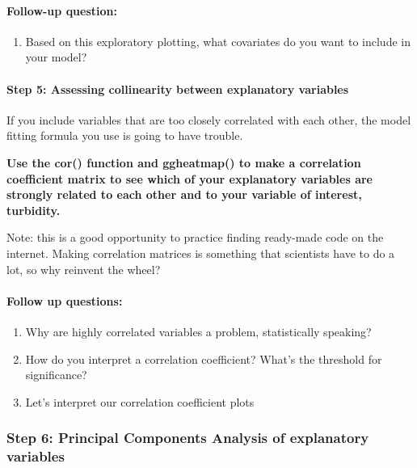 \documentclass[]{article}
\providecommand{\tightlist}{%
  \setlength{\itemsep}{0pt}\setlength{\parskip}{0pt}}
\let\oldparagraph\paragraph
\renewcommand{\paragraph}[1]{\oldparagraph{#1}\mbox{}}
\begin{document}
\hypertarget{follow-up-question}{%
\paragraph{Follow-up question:}\label{follow-up-question}}

\begin{enumerate}
\def\labelenumi{\arabic{enumi}.}
\tightlist
\item
  Based on this exploratory plotting, what covariates do you want to
  include in your model?
\end{enumerate}

\hypertarget{step-5-assessing-collinearity-between-explanatory-variables}{%
\paragraph{Step 5: Assessing collinearity between explanatory
variables}\label{step-5-assessing-collinearity-between-explanatory-variables}}

If you include variables that are too closely correlated with each
other, the model fitting formula you use is going to have trouble.

\textbf{Use the cor() function and ggheatmap() to make a correlation
coefficient matrix to see which of your explanatory variables are
strongly related to each other and to your variable of interest,
turbidity.}

Note: this is a good opportunity to practice finding ready-made code on
the internet. Making correlation matrices is something that scientists
have to do a lot, so why reinvent the wheel?

\hypertarget{follow-up-questions-1}{%
\paragraph{Follow up questions:}\label{follow-up-questions-1}}

\begin{enumerate}
\def\labelenumi{\arabic{enumi}.}
\tightlist
\item
  Why are highly correlated variables a problem, statistically speaking?
\item
  How do you interpret a correlation coefficient? What's the threshold
  for significance?
\item
  Let's interpret our correlation coefficient plots
\end{enumerate}

\hypertarget{step-6-principal-components-analysis-of-explanatory-variables}{%
\subsubsection{Step 6: Principal Components Analysis of explanatory
variables}\label{step-6-principal-components-analysis-of-explanatory-variables}}
\end{document}
